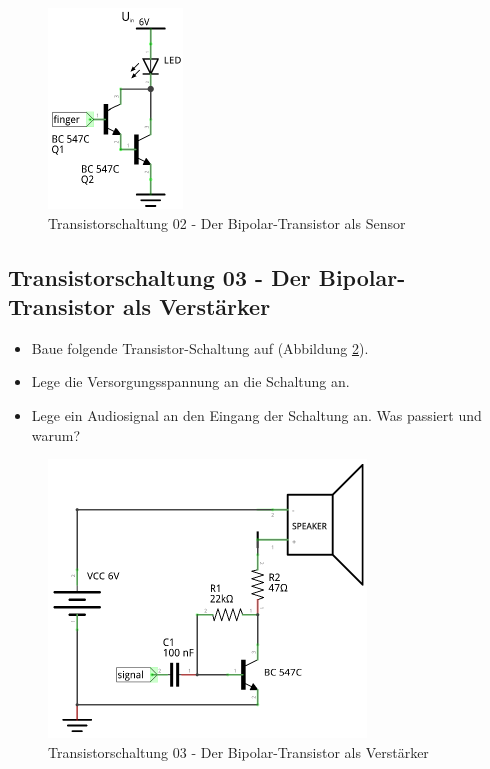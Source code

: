 \begin{figure}[H]
	\centering
	\includegraphics[scale=1.6]{Transistor/Schaltungen/NPN_Sensor.pdf}
	\caption{Transistorschaltung 02 - Der Bipolar-Transistor als Sensor}
	\label{s02}
\end{figure}


\subsection*{Transistorschaltung 03 - Der Bipolar-Transistor als Verstärker}

\begin{itemize}
\itemsep1pt\parskip0pt
\item Baue folgende Transistor-Schaltung auf (Abbildung \ref{s03}). 
\item Lege die Versorgungsspannung an die Schaltung an.
\item Lege ein Audiosignal an den Eingang der Schaltung an. Was passiert und warum?
\end{itemize}

\begin{figure}[H]
	\centering
	\includegraphics[scale=1.6]{Transistor/Schaltungen/NPN_Verstaerker.pdf}
	\caption{Transistorschaltung 03 - Der Bipolar-Transistor als Verstärker}
	\label{s03}
\end{figure}
